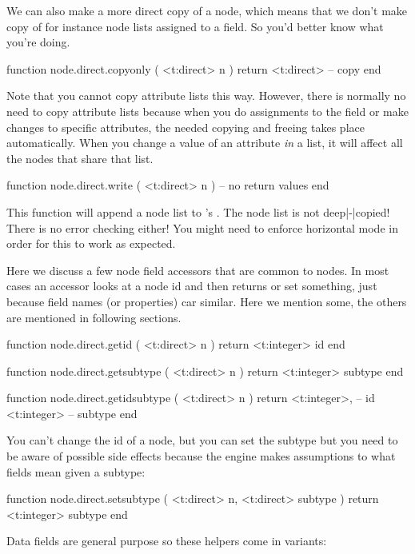 We can also make a more direct copy of a node, which means that we don't make
copy of for instance node lists assigned to a field. So you'd better know what
you're doing.

\starttyping[option=LUA]
function node.direct.copyonly ( <t:direct> n )
    return <t:direct> -- copy
end
\stoptyping

Note that you cannot copy attribute lists this way. However, there is normally no
need to copy attribute lists because when you do assignments to the 
field or make changes to specific attributes, the needed copying and freeing
takes place automatically. When you change a value of an attribute {\em in} a
list, it will affect all the nodes that share that list.

\starttyping[option=LUA]
function node.direct.write ( <t:direct> n )
    -- no return values
end
\stoptyping

This function will append a node list to \TEX's . The node
list is not deep|-|copied! There is no error checking either! You might need to
enforce horizontal mode in order for this to work as expected.

\stopsubsection

\startsubsection[title={Common properties}]

Here we discuss a few node field accessors that are common to nodes. In most
cases an accessor looks at a node id and then returns or set something, just
because field names (or properties) car similar. Here we mention some, the others
are mentioned in following sections.

\starttyping[option=LUA]
function node.direct.getid ( <t:direct> n )
    return <t:integer> id
end

function node.direct.getsubtype ( <t:direct> n )
    return <t:integer> subtype
end

function node.direct.getidsubtype ( <t:direct> n )
    return
        <t:integer>, -- id
        <t:integer>  -- subtype
end
\stoptyping

You can't change the id of a node, but you can set the subtype but you need to be
aware of possible side effects because the engine makes assumptions to what
fields mean given a subtype:

\starttyping[option=LUA]
function node.direct.setsubtype (
    <t:direct> n,
    <t:direct> subtype
)
    return <t:integer> subtype
end
\stoptyping

\stopsubsection

Data fields are general purpose so these helpers come in variants:

